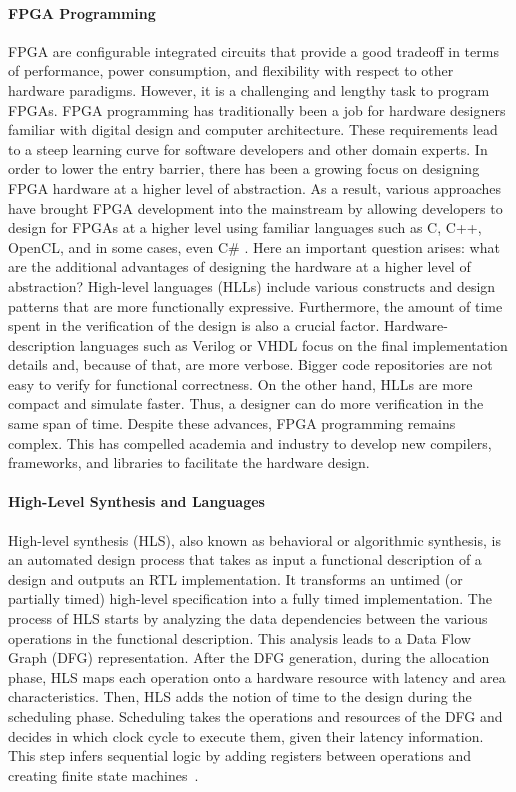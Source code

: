 \paragraph*{FPGA Programming}
FPGA are configurable integrated circuits that provide a good tradeoff in
terms of performance, power consumption, and flexibility with
respect to other hardware paradigms. However, it is a challenging and lengthy task to program FPGAs. FPGA programming has traditionally been a job for hardware designers familiar with digital design and computer architecture. These requirements lead to a steep learning curve for software developers and other domain experts. In order to lower the entry barrier, there has been a growing focus on designing FPGA hardware at a higher level of abstraction. As a result, various approaches have brought FPGA development into the mainstream by allowing developers to design for FPGAs at a higher level using familiar languages such as C, C++, OpenCL, and in some cases, even C\# \cite{kiwiHLS}. Here an important question arises: what are the additional advantages of designing the hardware at a higher level of abstraction? High-level languages (HLLs) include various constructs and design patterns that are more functionally expressive. Furthermore, the amount of time spent in the verification of the design is also a crucial factor. Hardware-description languages such as Verilog or VHDL focus on the final implementation details and, because of that, are more verbose. Bigger code repositories are not easy to verify for functional correctness. On the other hand, HLLs are more compact and simulate faster. Thus, a designer can do more verification in the same span of time. Despite these advances, FPGA programming remains complex. This has compelled academia and industry to develop new compilers, frameworks, and libraries to facilitate the hardware design.

\paragraph*{High-Level Synthesis and Languages}

High-level synthesis (HLS), also known as behavioral or algorithmic synthesis, is an automated design process that takes as input a functional description of a design and outputs an RTL implementation. It transforms an untimed (or partially timed) high-level specification into a fully timed implementation. The process of HLS starts by analyzing the data dependencies between the various operations in the functional description. This analysis leads to a Data Flow Graph (DFG) representation. After the DFG generation, during the allocation phase, HLS maps each operation onto a hardware resource with latency and area characteristics. Then, HLS adds the notion of time to the design during the scheduling phase. Scheduling takes the operations and resources of the DFG and decides in which clock cycle to execute them, given their latency information. This step infers sequential logic by adding registers between operations and creating finite state machines~\cite{hlsbluebook}. 

